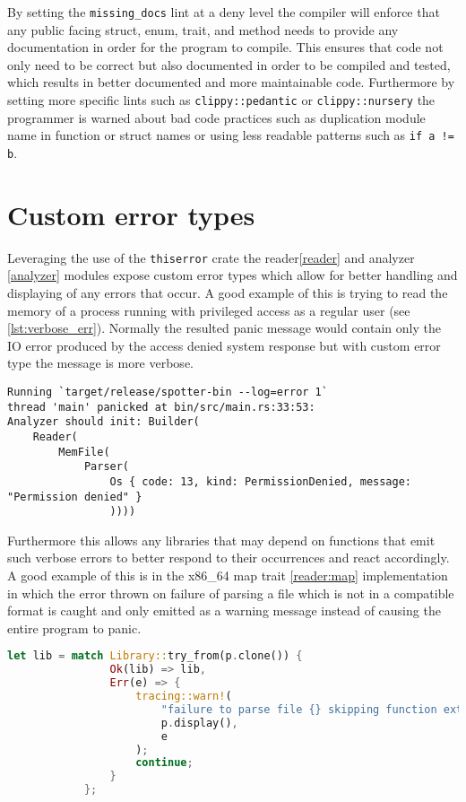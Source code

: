 \begin{enumerate}
    By setting the \verb|missing_docs| lint at a deny level the compiler will enforce that any public facing struct, enum, trait, and method needs to provide any documentation in order for the program to compile. This ensures that code not only need to be correct but also documented in order to be compiled and tested, which results in better documented and more maintainable code. 
    Furthermore by setting more specific lints such as \verb|clippy::pedantic| or \verb|clippy::nursery| the programmer is warned about bad code practices such as duplication module name in function or struct names or using less readable patterns such as \verb|if a != b|.
\end{enumerate}

\section{Custom error types}

Leveraging the use of the \verb|thiserror| crate \cite{tolnay_dtolnaythiserror_2024} the reader\ref{reader} and analyzer \ref{analyzer} modules expose custom error types which allow for better handling and displaying of any errors that occur. 
A good example of this is trying to read the memory of a process running with privileged access as a regular user (see \ref{lst:verbose_err}). Normally the resulted panic message would contain only the IO error produced by the access denied system response but with custom error type the message is more verbose.

\begin{lstlisting}[caption=\label{lst:verbose_err}"Error when trying to read the pid 1 process"]
Running `target/release/spotter-bin --log=error 1`
thread 'main' panicked at bin/src/main.rs:33:53:
Analyzer should init: Builder(
    Reader(
        MemFile(
            Parser(
                Os { code: 13, kind: PermissionDenied, message: "Permission denied" }
                ))))
\end{lstlisting}

Furthermore this allows any libraries that may depend on functions that emit such verbose errors to better respond to their occurrences and react accordingly. 
A good example of this is in the x86\_64 map trait \ref{reader:map} implementation in which the error thrown on failure of parsing a file which is not in a compatible format is caught and only emitted as a warning message instead of causing the entire program to panic.

\begin{lstlisting}[caption=\label{lst:err_handling}"Customm error handling example", language=Rust]
let lib = match Library::try_from(p.clone()) {
                Ok(lib) => lib,
                Err(e) => {
                    tracing::warn!(
                        "failure to parse file {} skipping function extraction ({})",
                        p.display(),
                        e
                    );
                    continue;
                }
            };
\end{lstlisting}

